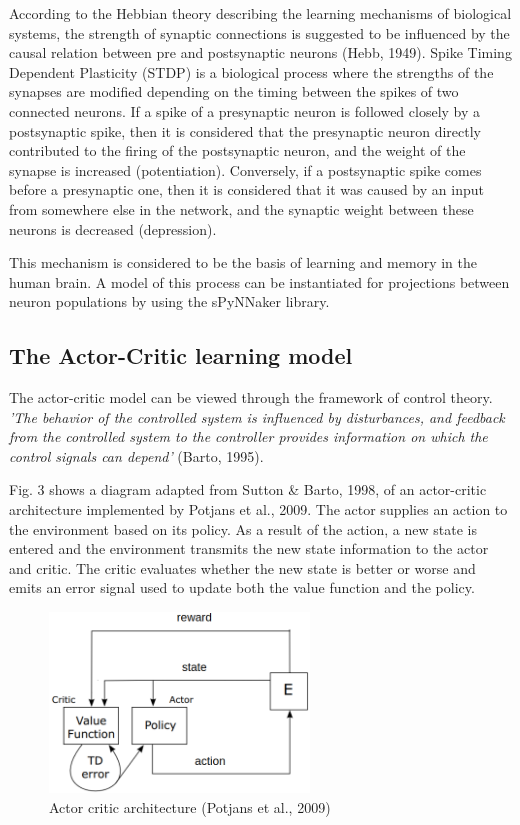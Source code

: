 \documentclass[10pt]{article}
\begin{document}
    According to the Hebbian theory describing the learning mechanisms of biological systems, the strength of synaptic connections is suggested to be influenced by the causal relation between pre and postsynaptic neurons (Hebb, 1949).
    Spike Timing Dependent Plasticity (STDP) is a biological process where the strengths of the synapses are modified depending on the timing between the spikes of two connected neurons. If a spike of a presynaptic neuron is followed closely by a postsynaptic spike, then it is considered that the presynaptic neuron directly contributed to the firing of the postsynaptic neuron, and the weight of the synapse is increased (potentiation). Conversely, if a postsynaptic spike comes before a presynaptic one, then it is considered that it was caused by an input from somewhere else in the network, and the synaptic weight between these neurons is decreased (depression).

    This mechanism is considered to be the basis of learning and memory in the human brain. A model of this process can be instantiated for projections between neuron populations by using the sPyNNaker library.

    \subsection{The Actor-Critic learning model}

    The actor-critic model can be viewed through the framework of control theory. \textit{'The behavior of the controlled system is influenced
    by disturbances, and feedback from the controlled system to the controller provides information on which the control signals can depend'} (Barto, 1995).

    Fig. 3 shows a diagram adapted from Sutton \& Barto, 1998, of an actor-critic architecture implemented by Potjans et al., 2009. The actor supplies an action to the environment based on its policy. As a result of the action, a new state is entered and the environment transmits the new state information to the actor and critic. The critic evaluates whether the new state is better or worse and emits an error signal used to update both the value function and the policy.

    \begin{figure}[ht!]
    \centering
    \includegraphics[width=69mm]{./actorCriticDiagram.png}
    \caption{Actor critic architecture (Potjans et al., 2009)}
    \end{figure}
\end{document}
